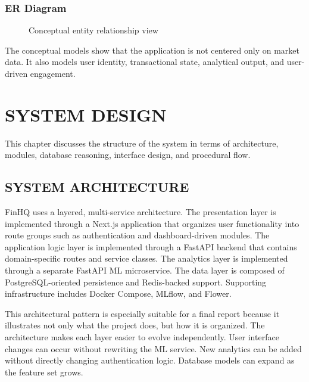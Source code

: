\documentclass[12pt,a4paper]{report}
\newcommand{\projectshort}{FinHQ}
\begin{document}
\subsection{ER Diagram}
\begin{figure}[H]
\centering
{}
\caption{Conceptual entity relationship view}
\end{figure}

The conceptual models show that the application is not centered only on market data. It also models user identity, transactional state, analytical output, and user-driven engagement.

\chapter{SYSTEM DESIGN}
This chapter discusses the structure of the system in terms of architecture, modules, database reasoning, interface design, and procedural flow.

\section{SYSTEM ARCHITECTURE}
\projectshort{} uses a layered, multi-service architecture. The presentation layer is implemented through a Next.js application that organizes user functionality into route groups such as authentication and dashboard-driven modules. The application logic layer is implemented through a FastAPI backend that contains domain-specific routes and service classes. The analytics layer is implemented through a separate FastAPI ML microservice. The data layer is composed of PostgreSQL-oriented persistence and Redis-backed support. Supporting infrastructure includes Docker Compose, MLflow, and Flower.

This architectural pattern is especially suitable for a final report because it illustrates not only what the project does, but how it is organized. The architecture makes each layer easier to evolve independently. User interface changes can occur without rewriting the ML service. New analytics can be added without directly changing authentication logic. Database models can expand as the feature set grows.
\end{document}
